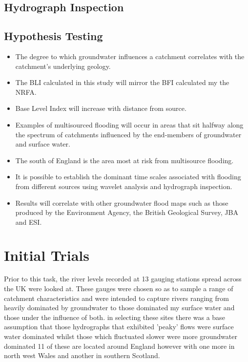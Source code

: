 \documentclass[DIV=calc, paper=a4, fontsize=11pt, twocolumn]{scrartcl}	 %
\begin{document}
	\subsection{Hydrograph Inspection}
	\subsection{Hypothesis Testing}
		\begin{itemize}
			\item The degree to which groundwater influences a catchment correlates with the catchment's underlying geology.
			\item The BLI calculated in this study will mirror the BFI calculated my the NRFA.
			\item Base Level Index will increase with distance from source.
			\item Examples of multisourced flooding will occur in areas that sit halfway along the spectrum of catchments influenced by the end-members of groundwater and surface water.
			\item The south of England is the area most at risk from multisource flooding.
			\item It is possible to establish the dominant time scales associated with flooding from different sources using wavelet analysis and hydrograph inspection.
			\item Results will correlate with other groundwater flood maps such as those produced by the Environment Agency, the British Geological Survey, JBA and ESI.
		\end{itemize}

\section{Initial Trials}
Prior to this task, the river levels recorded at 13 gauging stations spread across the UK were looked at. These gauges were chosen so as to sample a range of catchment characteristics and were intended to capture rivers ranging from heavily dominated by groundwater to those dominated my surface water and those under the influence of both. in selecting these sites there was a base assumption that those hydrographs that exhibited 'peaky' flows were surface water dominated whilst those which fluctuated slower were more groundwater dominated 11 of these are located around England however with one more in north west Wales and another in southern Scotland.
\end{document}
